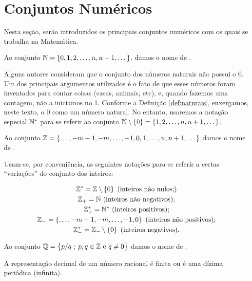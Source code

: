 \section{Conjuntos Numéricos}

Nesta seção, serão introduzidos os principais conjuntos numéricos com os quais se trabalha na Matemática.

\begin{definition}
\label{def:naturais}
Ao conjunto $\mathbb{N} = \left\{ 0, 1, 2, \dots , n, n+1, \dots\right\}$, damos o nome de .
\end{definition}

Alguns autores consideram que o conjunto dos números naturais não possui o 0.
Um dos principais argumentos utilizados é o fato de que esses números foram inventados para contar coisas (casas, animais, etc), e, quando fazemos uma contagem, não a iniciamos no 1.
Conforme a Definição \ref{def:naturais}, enxergamos, neste texto, o 0 como um número natural. No entanto, usaremos a notação especial $\mathbb{N}^*$ para se referir ao conjunto $\mathbb{N} \setminus \left\{ 0\right\} = \left\{ 1, 2, \dots, n, n+1, \dots\right\}$.


\begin{definition}
Ao conjunto $\mathbb{Z} =\left\{ \dots , -m -1, -m, \dots, -1, 0, 1,  \dots , n, n+1, \dots\right\}$ damos o nome de . 
\end{definition}

\noindent Usam-se, por conveniência, as seguintes notações para se referir a certas ``variações'' do conjunto dos inteiros:

\begin{gather*}
	\mathbb{Z}^\ast = \mathbb{Z} \setminus \left\{ 0\right\} \text{ (inteiros não nulos;)}\\
	\mathbb{Z}_+ = \mathbb{N} \text{ (inteiros não negativos);} \\
	\mathbb{Z}^\ast_+ =\mathbb{N} ^\ast \text{ (inteiros positivos);} \\
	\mathbb{Z}_- =\left\{ \dots , -m -1, -m, \dots, -1, 0\right\} \text{ (inteiros não positivos);} \\
	\mathbb{Z}_-^\ast =\mathbb{Z}_- \setminus \left\{ 0\right\} \text{ (inteiros negativos).}
\end{gather*}

\begin{definition}
Ao conjunto $\mathbb{Q} = \left\{ p/q \;;\; p, q \in \mathbb{Z} \text{ e } q \neq 0\right\}$ damos o nome de .
\end{definition}

\begin{remark}
A representação decimal de um número racional é finita ou é uma dízima periódica (infinita).
\end{remark}

